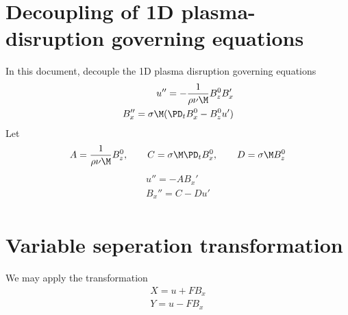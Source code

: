 \documentclass[11pt]{article}
\begin{document}
\doublespacing
\MOONSTITLE
\maketitle

\section{Decoupling of 1D plasma-disruption governing equations}
In this document, decouple the 1D plasma disruption governing equations
\begin{equation}\begin{aligned}
u''   = - \frac{1}{\rho \nu \M} B_z^0 B_x' \\
B_x'' = \sigma \M (\PD_t B_x^0 - B_z^0 u') \\
\end{aligned} \end{equation}
Let
\begin{equation}\begin{aligned}
A = \frac{1}{\rho \nu \M} B_z^0, \qquad
C = \sigma \M \PD_t B_x^0, \qquad
D = \sigma \M B_z^0
\end{aligned} \end{equation}
\begin{equation}\begin{aligned}
u''   = - A B_x' \\
B_x'' = C - D u' \\
\end{aligned} \end{equation}

\section{Variable seperation transformation}
We may apply the transformation
\begin{equation}\begin{aligned}
X = u + F B_x \\
Y = u - F B_x \\
\end{aligned} \end{equation}
\end{document}
